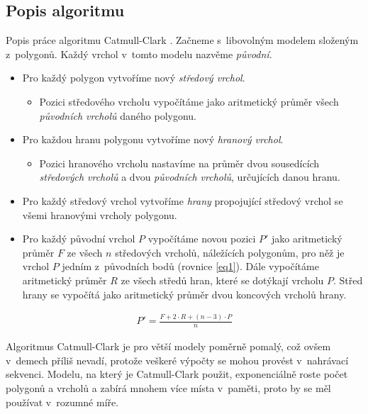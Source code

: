 \subsection{Popis algoritmu}
Popis práce algoritmu Catmull-Clark \cite{catmullClarkWP}.
Začneme s~libovolným modelem složeným z~polygonů.
Každý vrchol v~tomto modelu nazvěme \emph{původní}.

\begin{itemize}
  \item Pro každý polygon vytvoříme nový \emph{středový vrchol}.
  \begin{itemize}
    \item Pozici středového vrcholu vypočítáme jako aritmetický průměr všech \emph{původních vrcholů} daného polygonu.
  \end{itemize}
  \item Pro každou hranu polygonu vytvoříme nový \emph{hranový vrchol}.
  \begin{itemize}
    \item Pozici hranového vrcholu nastavíme na průměr dvou sousedících \emph{středových vrcholů} a dvou \emph{původních vrcholů}, určujících danou hranu.
  \end{itemize}
  \item Pro každý středový vrchol vytvoříme \emph{hrany} propojující středový vrchol se všemi hranovými vrcholy polygonu.
  \item Pro každý původní vrchol $P$ vypočítáme novou pozici $P'$ jako aritmetický průměr $F$ ze všech $n$ středových vrcholů, náležících polygonům, pro něž je vrchol $P$ jedním z~původních bodů (rovnice \ref{eq1}). Dále vypočítáme aritmetický průměr $R$ ze všech středů hran, které se dotýkají vrcholu $P$. Střed hrany se vypočítá jako aritmetický průměr dvou koncových vrcholů hrany.
\end{itemize}

\begin{eqnarray}
  P' = \frac{F + 2 \cdot R + (n - 3) \cdot P}{n} \label{eq1}
\end{eqnarray}

Algoritmus Catmull-Clark je pro větší modely poměrně pomalý, což ovšem v~demech příliš nevadí, protože veškeré výpočty se mohou provést v~nahrávací sekvenci.
Modelu, na který je Catmull-Clark použit, exponenciálně roste počet polygonů a vrcholů a zabírá mnohem více místa v~paměti, proto by se měl používat v~rozumné míře.

